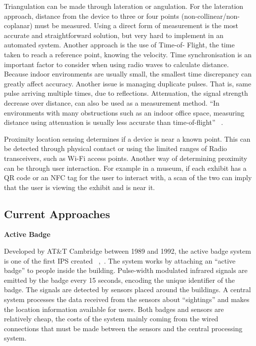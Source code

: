 Triangulation can be made through lateration or angulation. For the lateration approach, distance from the device to three or four points (non-collinear/non-coplanar) must be measured. Using a direct form of measurement is the most accurate and straightforward solution, but very hard to implement in an automated system. Another approach is the use of Time-of-
Flight, the time taken to reach a reference point, knowing the velocity. Time synchronisation is an important factor to consider when using radio waves to calculate distance. Because indoor environments are usually small, the smallest time discrepancy can greatly affect accuracy. Another issue is managing duplicate pulses. That is, same pulse arriving multiple times, due to reflections. Attenuation, the signal strength decrease over distance, can also be used as a measurement method. “In environments with many obstructions such as an indoor office space, measuring distance using attenuation is usually less accurate than time-of-flight” ~\cite{Hightower}.

Proximity location sensing determines if a device is near a known point. This can be detected through physical contact or using the limited ranges of Radio transceivers, such as Wi-Fi access points. Another way of determining proximity can be through user interaction. For example in a museum, if each exhibit has a QR code or an NFC tag for the user to interact with, a scan of the two can imply that the user is viewing the exhibit and is near it.
\subsection{Current Approaches}

\noindent \textbf{Active Badge}

Developed by AT\&T Cambridge between 1989 and 1992, the active badge system is one of the first IPS created ~\cite{Want},~\cite{ActiveBadge}. The system works by attaching an “active badge” to people inside the building. Pulse-width modulated infrared signals are emitted by the badge every 15 seconds, encoding the unique identifier of the badge. The signals are detected by sensors placed around the buildings. A central system processes the data received from the sensors about “sightings” and makes the location information available for users. Both badges and sensors are relatively cheap, the costs of the system mainly coming from the wired connections that must be made between the sensors and the central processing system. 

